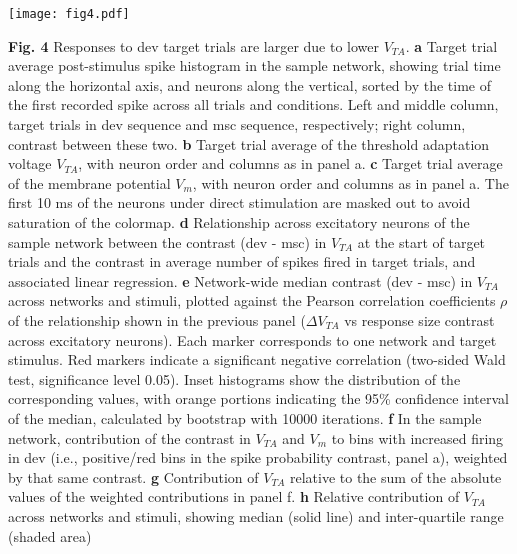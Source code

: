 \documentclass[pdflatex,referee,iicol,sn-basic]{sn-jnl}
\theoremstyle{thmstyleone}%
\theoremstyle{thmstyletwo}%
\theoremstyle{thmstylethree}%
\begin{document}
\begin{figure*}%
    \centering
    \texttt{[image: fig4.pdf]}
    \caption{}
    \label{fig4}
\end{figure*}
\textbf{Fig. 4} Responses to dev target trials are larger due to lower $V_{TA}$.
\textbf{a} Target trial average post-stimulus spike histogram in the sample network, showing trial time along the horizontal axis, and neurons along the vertical, sorted by the time of the first recorded spike across all trials and conditions. Left and middle column, target trials in dev sequence and msc sequence, respectively; right column, contrast between these two.
\textbf{b} Target trial average of the threshold adaptation voltage $V_{TA}$, with neuron order and columns as in panel a.
\textbf{c} Target trial average of the membrane potential $V_m$, with neuron order and columns as in panel a. The first 10 ms of the neurons under direct stimulation are masked out to avoid saturation of the colormap.
\textbf{d} Relationship across excitatory neurons of the sample network between the contrast (dev - msc) in $V_{TA}$ at the start of target trials and the contrast in average number of spikes fired in target trials, and associated linear regression.
\textbf{e} Network-wide median contrast (dev - msc) in $V_{TA}$ across networks and stimuli, plotted against the Pearson correlation coefficients $\rho$ of the relationship shown in the previous panel ($\Delta V_{TA}$ vs response size contrast across excitatory neurons). Each marker corresponds to one network and target stimulus. Red markers indicate a significant negative correlation (two-sided Wald test, significance level 0.05). Inset histograms show the distribution of the corresponding values, with orange portions indicating the 95\% confidence interval of the median, calculated by bootstrap with 10000 iterations.
\textbf{f} In the sample network, contribution of the contrast in $V_{TA}$ and $V_m$ to bins with increased firing in dev (i.e., positive/red bins in the spike probability contrast, panel a), weighted by that same contrast.
\textbf{g} Contribution of $V_{TA}$ relative to the sum of the absolute values of the weighted contributions in panel f.
\textbf{h} Relative contribution of $V_{TA}$ across networks and stimuli, showing median (solid line) and inter-quartile range (shaded area)
\end{document}
